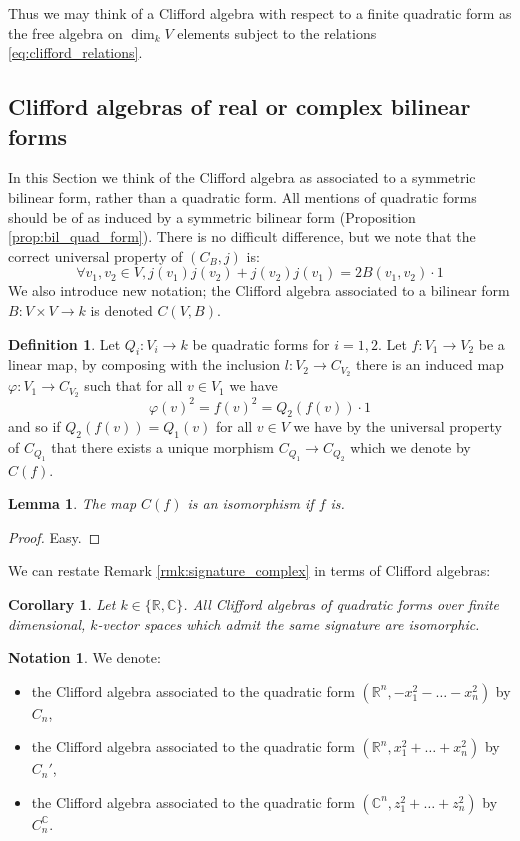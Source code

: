 \documentclass[12pt]{article}
\theoremstyle{plain}
\newtheorem{lemma}[thm]{Lemma}
\newtheorem{cor}[thm]{Corollary}
\theoremstyle{definition}
\newtheorem{defn}[thm]{Definition} %
\newtheorem{notation}[thm]{Notation}
\newcommand{\bb}[1]{\mathbb{#1}}
\newcommand{\lto}{\longrightarrow}
\begin{document}
Thus we may think of a Clifford algebra with respect to a finite quadratic form as the free algebra on $\operatorname{dim}_kV$ elements subject to the relations \eqref{eq:clifford_relations}.

\subsection{Clifford algebras of real or complex bilinear forms}
In this Section we think of the Clifford algebra as associated to a symmetric bilinear form, rather than a quadratic form.  All mentions of quadratic forms should be of as induced by a symmetric bilinear form (Proposition \ref{prop:bil_quad_form}). There is no difficult difference, but we note that the correct universal property of $(C_B,j)$ is:
\begin{equation}
\forall v_1,v_2 \in V, j(v_1)j(v_2) + j(v_2)j(v_1) = 2B(v_1,v_2)\cdot 1
\end{equation}
We also introduce new notation; the Clifford algebra associated to a bilinear form $B: V \times V \lto k$ is denoted $C(V,B)$.
\begin{defn}
Let $Q_i: V_i \lto k$ be quadratic forms for $i = 1,2$. Let $f: V_1 \lto V_2$ be a linear map, by composing with the inclusion $l: V_2 \lto C_{V_2}$ there is an induced map $\varphi: V_1 \lto C_{V_2}$ such that for all $v \in V_1$ we have
\begin{equation}
\varphi(v)^2 = f(v)^2 = Q_2(f(v))\cdot 1
\end{equation}
and so if $Q_2(f(v)) = Q_1(v)$ for all $v \in V$ we have by the universal property of $C_{Q_1}$ that there exists a unique morphism $C_{Q_1} \lto C_{Q_2}$ which we denote by $C(f)$.
\end{defn}
\begin{lemma}
The map $C(f)$ is an isomorphism if $f$ is.
\end{lemma}
\begin{proof}
Easy.
\end{proof}
We can restate Remark \ref{rmk:signature_complex} in terms of Clifford algebras:
\begin{cor}\label{cor:signature_determines}
Let $k\in \lbrace \bb{R},\bb{C}\rbrace$. All Clifford algebras of quadratic forms over finite dimensional, $k$-vector spaces which admit the same signature are isomorphic.
\end{cor}
\begin{notation}
We denote:
\begin{itemize}
\item the Clifford algebra associated to the quadratic form $(\bb{R}^n, -x_1^2 - \hdots - x_n^2)$ by $C_n$,
\item the Clifford algebra associated to the quadratic form $(\bb{R}^n, x_1^2 + \hdots + x_n^2)$ by $C_n'$,
\item the Clifford algebra associated to the quadratic form $(\bb{C}^n, z_1^2 + \hdots + z_n^2)$ by $C_n^{\bb{C}}$.
\end{itemize}
\end{notation}
\end{document}
